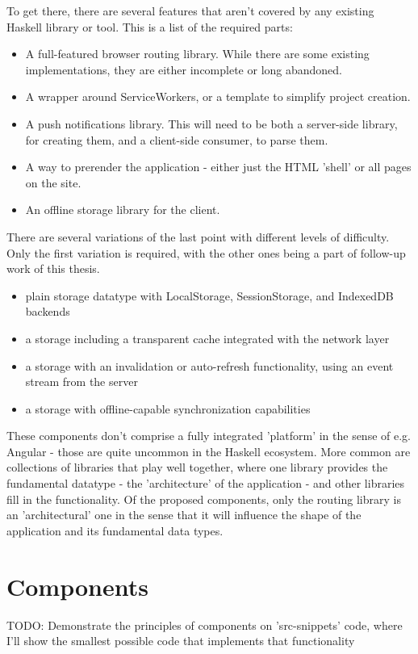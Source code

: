 \documentclass[english,odsaz]{fitthesis}
\begin{document}
To get there, there are several features that aren't covered by any existing
Haskell library or tool. This is a list of the required parts:
\begin{itemize}
\item A full-featured browser routing library. While there are some existing
implementations, they are either incomplete or long abandoned.
\item A wrapper around ServiceWorkers, or a template to simplify project creation.
\item A push notifications library. This will need to be both a server-side library,
for creating them, and a client-side consumer, to parse them.
\item A way to prerender the application - either just the HTML 'shell' or all pages on the site.
\item An offline storage library for the client.
\end{itemize}

There are several variations of the last point with different levels of
difficulty. Only the first variation is required, with the other ones being a
part of follow-up work of this thesis.
\begin{itemize}
\item plain storage datatype with LocalStorage, SessionStorage, and IndexedDB backends
\item a storage including a transparent cache integrated with the network layer
\item a storage with an invalidation or auto-refresh functionality, using an event
stream from the server
\item a storage with offline-capable synchronization capabilities
\end{itemize}

These components don't comprise a fully integrated 'platform' in the sense of
e.g. Angular - those are quite uncommon in the Haskell ecosystem. More common
are collections of libraries that play well together, where one library provides
the fundamental datatype - the 'architecture' of the application - and other
libraries fill in the functionality. Of the proposed components, only the
routing library is an 'architectural' one in the sense that it will influence
the shape of the application and its fundamental data types.

\chapter{Components}
\label{sec:org511bf99}
TODO: Demonstrate the principles of components on 'src-snippets' code, where
I'll show the smallest possible code that implements that functionality
\end{document}
